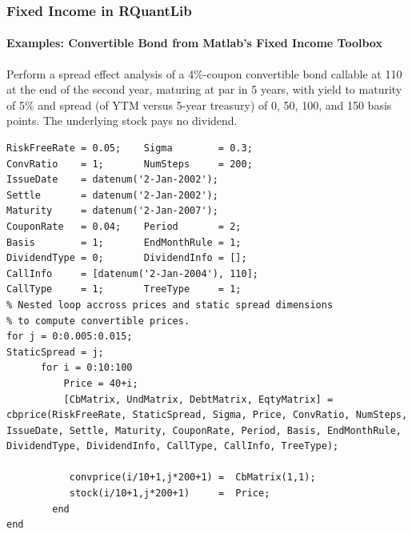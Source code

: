 \documentclass[compress]{beamer}
\begin{document}
\begin{frame}[fragile]
	\frametitle{Fixed Income in RQuantLib}
	\framesubtitle{Examples: Convertible Bond from Matlab's Fixed Income Toolbox}	
Perform a spread effect analysis of a 4\%-coupon convertible bond callable at 110 at the end of the second year, maturing at par in 5 years, with yield to maturity of 5\% and spread (of YTM versus 5-year treasury) of 0, 50, 100, and 150 basis points. The underlying stock pays no dividend. 
\lstset{language=Matlab,basicstyle=\tiny}
	\begin{lstlisting}
RiskFreeRate = 0.05;	Sigma        = 0.3;
ConvRatio    = 1;   	NumSteps     = 200;
IssueDate    = datenum('2-Jan-2002');
Settle       = datenum('2-Jan-2002');
Maturity     = datenum('2-Jan-2007');
CouponRate   = 0.04;    Period       = 2;
Basis        = 1;		EndMonthRule = 1;
DividendType = 0;		DividendInfo = [];
CallInfo     = [datenum('2-Jan-2004'), 110]; 
CallType     = 1;		TreeType     = 1;   
% Nested loop accross prices and static spread dimensions
% to compute convertible prices.
for j = 0:0.005:0.015;
StaticSpread = j;
      for i = 0:10:100
          Price = 40+i;
          [CbMatrix, UndMatrix, DebtMatrix, EqtyMatrix] =  cbprice(RiskFreeRate, StaticSpread, Sigma, Price, ConvRatio, NumSteps, IssueDate, Settle, Maturity, CouponRate, Period, Basis, EndMonthRule, DividendType, DividendInfo, CallType, CallInfo, TreeType);
   
           convprice(i/10+1,j*200+1) =  CbMatrix(1,1);
           stock(i/10+1,j*200+1)     =  Price;
        end    
end
\end{lstlisting}
\end{frame}
\end{document}
